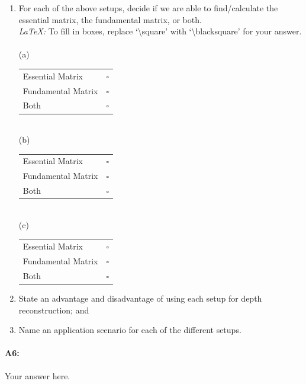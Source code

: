 \begin{enumerate}
\item For each of the above setups, decide if we are able to find/calculate the essential matrix, the fundamental matrix, or both. \\
\emph{LaTeX:} To fill in boxes, replace `\textbackslash square' with `\textbackslash blacksquare' for your answer. \\ \\
(a)
\begin{tabular}[h]{lc}
\toprule
Essential Matrix & $\square$ \\
Fundamental Matrix & $\square$ \\
Both & $\square$ \\
\end{tabular} \\
(b)
\begin{tabular}[h]{lc}
\toprule
Essential Matrix & $\square$ \\
Fundamental Matrix & $\square$ \\
Both & $\square$ \\
\end{tabular} \\
(c)
\begin{tabular}[h]{lc}
\toprule
Essential Matrix & $\square$ \\
Fundamental Matrix & $\square$ \\
Both & $\square$ \\
\bottomrule
\end{tabular}
\item State an advantage and disadvantage of using each setup for depth reconstruction; and
\item Name an application scenario for each of the different setups.
\end{enumerate}

\paragraph{A6:} Your answer here.





